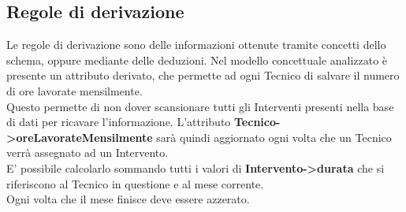 \documentclass[legalpaper]{article}
\begin{document}
\subsection{Regole di derivazione}
Le regole di derivazione sono delle informazioni ottenute tramite concetti dello schema, oppure mediante delle deduzioni. Nel modello concettuale analizzato è presente un attributo derivato, 
che permette ad ogni Tecnico di salvare il numero di ore lavorate mensilmente.\\
Questo permette di non dover scansionare tutti gli Interventi presenti nella base di dati per ricavare l'informazione.
L'attributo \textbf{Tecnico->oreLavorateMensilmente} sarà quindi aggiornato ogni volta che un Tecnico verrà assegnato ad un Intervento.\\
E' possibile calcolarlo sommando tutti i valori di \textbf{Intervento->durata} che si riferiscono al Tecnico in questione e al mese corrente.\\
Ogni volta che il mese finisce deve essere azzerato.\\
\end{document}
